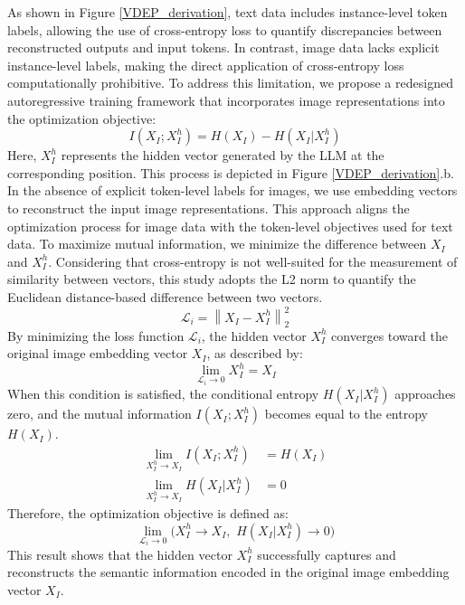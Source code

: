 As shown in Figure \ref{VDEP_derivation}, text data includes instance-level token labels, allowing the use of cross-entropy loss to quantify discrepancies between reconstructed outputs and input tokens. In contrast, image data lacks explicit instance-level labels, making the direct application of cross-entropy loss computationally prohibitive. To address this limitation, we propose a redesigned autoregressive training framework that incorporates image representations into the optimization objective:
\begin{equation}
\textstyle
I(X_I; X^{h}_I) = H(X_I) - H(X_I|X^{h}_I)
\end{equation}
Here, $X^{h}_I$ represents the hidden vector generated by the LLM at the corresponding position. This process is depicted in Figure \ref{VDEP_derivation}.b. In the absence of explicit token-level labels for images, we use embedding vectors to reconstruct the input image representations. This approach aligns the optimization process for image data with the token-level objectives used for text data. 
To maximize mutual information, we minimize the difference between $X_I$ and $X^{h}_I$. Considering that cross-entropy is not well-suited for the measurement of similarity between vectors, this study adopts the L2 norm to quantify the Euclidean distance-based difference between two vectors.
\begin{equation}
\textstyle
\mathcal{L}_i = \left\lVert X_I - X^{h}_I \right\rVert_2^2
\end{equation}
By minimizing the loss function $\mathcal{L}_i$, the hidden vector $X^{h}_I$ converges toward the original image embedding vector $X_I$, as described by:
\begin{equation}
\textstyle
\lim_{\mathcal{L}_i \to 0} X^{h}_I = X_I
\end{equation}
When this condition is satisfied, the conditional entropy $H(X_I | X^{h}_I)$ approaches zero, and the mutual information $I(X_I; X^{h}_I)$ becomes equal to the entropy $H(X_I)$.
\begin{equation}
\begin{aligned}
\textstyle
\lim_{X^{h}_I \to X_I} I(X_I; X^{h}_I) &= H(X_I)
\\
\lim_{X^{h}_I \to X_I} H(X_I | X^{h}_I) &= 0
\end{aligned}
\end{equation}
Therefore, the optimization objective is defined as:
\begin{equation}
\lim_{\mathcal{L}_i \to 0} \Big( X^{h}_I \to X_I, \, \, H(X_I | X^{h}_I) \to 0 \Big)
\end{equation}
This result shows that the hidden vector $X^{h}_I$ successfully captures and reconstructs the semantic information encoded in the original image embedding vector $X_I$.





